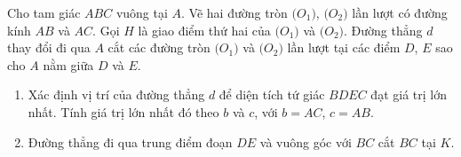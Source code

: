 \begin{bt}%
	Cho tam giác $ABC$ vuông tại $A$. Vẽ hai đường tròn $\big(O_1\big)$, $\big(O_2\big)$ lần lượt có đường kính $AB$ và $AC$. Gọi $H$ là giao điểm thứ hai của $\big(O_1\big)$ và $\big(O_2\big)$. Đường thẳng $d$ thay đổi đi qua $A$ cắt các đường tròn $\big(O_1\big)$ và $\big(O_2\big)$ lần lượt tại các điểm $D$, $E$ sao cho $A$ nằm giữa $D$ và $E$.
	\begin{enumerate}	
		\item  Xác định vị trí của đường thẳng $d$ để diện tích tứ giác $BDEC$ đạt giá trị lớn nhất. Tính giá trị lớn nhất đó theo $b$ và $c$, với $b = AC$, $c = AB$. 
		\item Đường thẳng đi qua trung điểm đoạn $DE$ và vuông góc với $BC$ cắt $BC$ tại $K$. 
		

\end{enumerate}
\end{bt}
